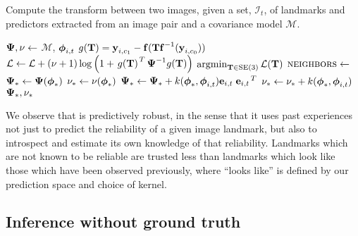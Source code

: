 \begin{algorithm}
  \caption{Compute the transform between two images, given a set, $\mathcal{I}_t$,
    of landmarks and predictors extracted from an image pair and a covariance
    model $\mathcal{M}$. }
  \label{alg:compute-transform}
  \begin{algorithmic}
        \State $\boldsymbol{\mathbf{\Psi}}, \nu\gets$  {$\mathcal{M}$, $
          \boldsymbol{\mathbf{\phi}}_{i,t}$}
        \State $g(\boldsymbol{\mathbf{T}}) = \boldsymbol{\mathbf{y}}_{i, c_1} -
          \boldsymbol{\mathbf{f}}( \boldsymbol{\mathbf{T}}\boldsymbol{\mathbf{f}}^{-1}(
          \boldsymbol{\mathbf{y}}_{i, c_0} ))$
        \State $\mathcal{L} \gets \mathcal{L} +
        (\nu+1)\log\left(1 + \left.{g(\boldsymbol{\mathbf{T}})}\right.^T
          \boldsymbol{\mathbf{\Psi}}^{-1}
        g(\boldsymbol{\mathbf{T}})\right)$
      \EndFor
      \State \Return $\operatorname*{argmin}_{\boldsymbol{\mathbf{T}}\in\text{SE}(3)}\mathcal{L}(\boldsymbol{\mathbf{T}})$
    \EndFunction
      \State $\textsc{neighbors}\gets$  
      \State $\boldsymbol{\mathbf{\Psi}}_* \gets \boldsymbol{\mathbf{\Psi}}(\boldsymbol{\mathbf{\phi}}_*)$ \State
      $\nu_* \gets \nu(\boldsymbol{\mathbf{\phi}}_*)$
        \State $\boldsymbol{\mathbf{\Psi}}_* \gets \boldsymbol{\mathbf{\Psi}}_* + k(\boldsymbol{\mathbf{\phi}}_*,
          \boldsymbol{\mathbf{\phi}}_{i,t}) \boldsymbol{\mathbf{e}}_{i,t}\left.{\boldsymbol{\mathbf{e}}_{i,t}}\right.^T$
        \State $\nu_* \gets \nu_* + k(\boldsymbol{\mathbf{\phi}}_*, \boldsymbol{\mathbf{\phi}}_{i,t})$
      \EndFor
    \State \Return $\boldsymbol{\mathbf{\Psi}}_*, \nu_*$
    \EndFunction
  \end{algorithmic}
\end{algorithm}

We observe that  is predictively robust, in the
sense that it uses past experiences not just to predict the reliability of a
given image landmark, but also to introspect and estimate its own knowledge of
that reliability.  Landmarks which are not known to be reliable are trusted 
less than landmarks which look like those which have been observed previously, where ``looks like'' is defined by our prediction space and choice of kernel. 

\subsection{Inference without ground truth}


